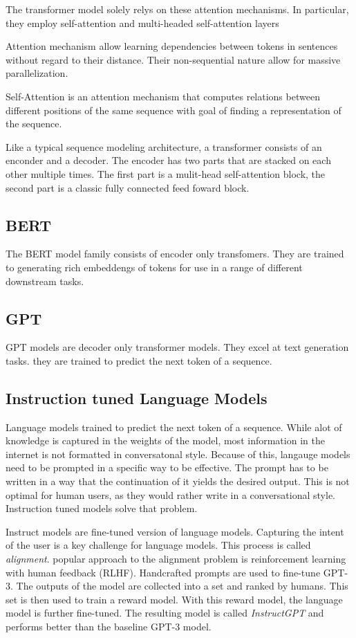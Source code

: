 \documentclass[english, version-2022-01]{uzl-thesis}
\begin{document}
The transformer model \cite{NIPS2017_3f5ee243} solely relys on these attention mechanisms. In particular, they employ self-attention and multi-headed self-attention layers

Attention mechanism allow learning dependencies between tokens in sentences without regard to their distance. Their non-sequential nature allow for massive parallelization.

Self-Attention is an attention mechanism that computes relations between different positions of the same sequence with goal of finding a representation of the sequence.

Like a typical sequence modeling architecture, a transformer consists of an enconder and a decoder. The encoder has two parts that are stacked on each other multiple times. The first part is a mulit-head self-attention block, the second part is a classic fully connected feed foward block.

\subsection{BERT}

The BERT model family consists of encoder only transfomers. They are trained to generating rich embeddengs of tokens for use in a range of different downstream tasks.

\subsection{GPT}

GPT models are decoder only transformer models. They excel at text generation tasks. they are trained to predict the next token of a sequence.
\subsection{Instruction tuned Language Models}

Language models trained to predict the next token of a sequence. While alot of knowledge is captured in the weights of the model, most information in the internet is not formatted in conversatonal style. Because of this, langauge models need to be prompted in a specific way to be effective. The prompt has to be written in a way that the continuation of it yields the desired output. This is not optimal for human users, as they would rather write in a conversational style. Instruction tuned models solve that problem.

Instruct models are fine-tuned version of language models. Capturing the intent of the user is a key challenge for language models. This process is called \textit{alignment}. popular approach to the alignment problem is reinforcement learning with human feedback (RLHF). Handcrafted prompts are used to fine-tune GPT-3. The outputs of the model are collected into a set and ranked by humans. This set is then used to train a reward model. With this reward model, the language model is further fine-tuned. The resulting model is called \textit{InstructGPT} and performs better than the baseline GPT-3 model.
\end{document}
